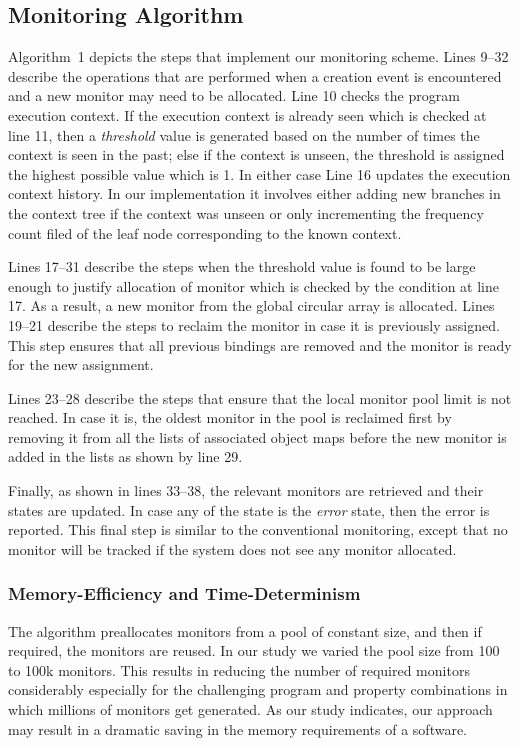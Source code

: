 \subsection{Monitoring Algorithm}
\label{subsec:algo}

Algorithm~1 depicts the steps that implement our monitoring scheme. Lines 9--32 
describe the operations that are performed when a creation event is encountered 
and a new monitor may need to be allocated. Line 10 checks the program execution 
context. If the execution context is already seen which is checked at  line 11, 
then a \textit{threshold} value is generated based on the number of times the 
context is seen in the past; else if the context is unseen, the threshold is 
assigned the highest possible value which is 1. In either case Line 16 updates 
the execution context history. In our implementation it involves either adding 
new branches in the context tree if the context was unseen or only incrementing 
the frequency count filed of the leaf node corresponding to the known context.

Lines 17--31 describe the steps when the threshold value is found to be large 
enough to justify allocation of monitor which is checked by the condition at 
line 17. As a result, a new monitor from the global circular array is allocated. 
Lines 19--21 describe the steps to reclaim the monitor in case it is previously 
assigned. This step ensures that all previous bindings are removed and the 
monitor is ready for the new assignment.

Lines 23--28 describe the steps that ensure that the local monitor pool limit is 
not reached. In case it is, the oldest monitor in the pool is reclaimed first by 
removing it from all the lists of associated object maps before the new monitor 
is added in the lists as shown by line 29.

Finally, as shown in lines 33--38, the relevant monitors are retrieved and their 
states are updated. In case any of the state is the \textit{error} state, then 
the error is reported. This final step is similar to the conventional 
monitoring, except that no monitor will be tracked if the system does not see 
any monitor allocated.


\subsubsection{Memory-Efficiency and Time-Determinism}
\label{subsubsec:efficiencyanddeterminism}

The algorithm preallocates monitors from a pool of constant size, and then if 
required, the monitors are reused. In our study we varied the pool size from 100 
to 100k monitors. This results in reducing the number of required monitors 
considerably especially for the challenging program and property combinations in 
which millions of monitors get generated. As our study indicates, our approach 
may result in a dramatic saving in the memory requirements of a software.

